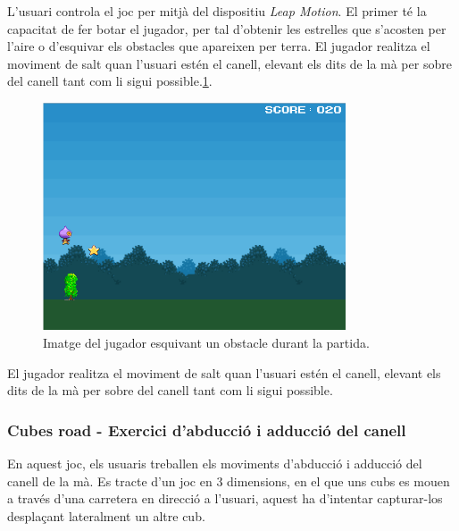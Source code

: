 \documentclass[12pt,a4paper,catalan]{article}
\begin{document}
	L'usuari controla el joc per mitjà del dispositiu \textit{Leap Motion}. El primer té la capacitat de fer botar el jugador, per tal d'obtenir les estrelles que s'acosten per l'aire o d'esquivar els obstacles que apareixen per terra. El jugador realitza el moviment de salt quan l'usuari estén el canell, elevant els dits de la mà per sobre del canell tant com li sigui possible.\ref{fig:runnerboy-obstacle}.
	\begin{figure}[H]
		\includegraphics[width=0.8\textwidth,keepaspectratio]{runner-boy-obstacle.png}
		\centering
		\caption{Imatge del jugador esquivant un obstacle durant la partida.}
		\label{fig:runnerboy-obstacle}
	\end{figure}
	El jugador realitza el moviment de salt quan l'usuari estén el canell, elevant els dits de la mà per sobre del canell tant com li sigui possible.
	\subsubsection{Cubes road - Exercici d'abducció i adducció del canell}
	En aquest joc, els usuaris treballen els moviments d'abducció i adducció del canell de la mà. Es tracte d'un joc en 3 dimensions, en el que uns cubs es mouen a través d'una carretera en direcció a l'usuari, aquest ha d'intentar capturar-los desplaçant lateralment un altre cub.
	
\end{document}
